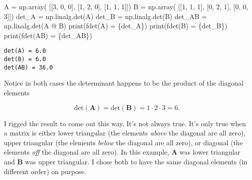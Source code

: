 \documentclass[
  letterpaper,
  DIV=11,
  numbers=noendperiod]{scrreprt}
\newenvironment{Shaded}{\begin{snugshade}}{\end{snugshade}}
\newcommand{\BuiltInTok}[1]{\textcolor[rgb]{0.00,0.23,0.31}{#1}}
\newcommand{\DecValTok}[1]{\textcolor[rgb]{0.68,0.00,0.00}{#1}}
\newcommand{\NormalTok}[1]{\textcolor[rgb]{0.00,0.23,0.31}{#1}}
\newcommand{\OperatorTok}[1]{\textcolor[rgb]{0.37,0.37,0.37}{#1}}
\newcommand{\SpecialCharTok}[1]{\textcolor[rgb]{0.37,0.37,0.37}{#1}}
\newcommand{\SpecialStringTok}[1]{\textcolor[rgb]{0.13,0.47,0.30}{#1}}
\begin{document}
\begin{Shaded}
\begin{Highlighting}[]
\NormalTok{A }\OperatorTok{=}\NormalTok{ np.array(}
\NormalTok{    [[}\DecValTok{3}\NormalTok{, }\DecValTok{0}\NormalTok{, }\DecValTok{0}\NormalTok{],}
\NormalTok{     [}\DecValTok{1}\NormalTok{, }\DecValTok{2}\NormalTok{, }\DecValTok{0}\NormalTok{],}
\NormalTok{     [}\DecValTok{1}\NormalTok{, }\DecValTok{1}\NormalTok{, }\DecValTok{1}\NormalTok{]])}
\NormalTok{B }\OperatorTok{=}\NormalTok{ np.array(}
\NormalTok{    [[}\DecValTok{1}\NormalTok{, }\DecValTok{1}\NormalTok{, }\DecValTok{1}\NormalTok{],}
\NormalTok{     [}\DecValTok{0}\NormalTok{, }\DecValTok{2}\NormalTok{, }\DecValTok{1}\NormalTok{],}
\NormalTok{     [}\DecValTok{0}\NormalTok{, }\DecValTok{0}\NormalTok{, }\DecValTok{3}\NormalTok{]])}
\NormalTok{det\_A }\OperatorTok{=}\NormalTok{ np.linalg.det(A)}
\NormalTok{det\_B }\OperatorTok{=}\NormalTok{ np.linalg.det(B)}
\NormalTok{det\_AB }\OperatorTok{=}\NormalTok{ np.linalg.det(A }\OperatorTok{@}\NormalTok{ B)}
\BuiltInTok{print}\NormalTok{(}\SpecialStringTok{f\textquotesingle{}det(A) = }\SpecialCharTok{\{}\NormalTok{det\_A}\SpecialCharTok{\}}\SpecialStringTok{\textquotesingle{}}\NormalTok{)}
\BuiltInTok{print}\NormalTok{(}\SpecialStringTok{f\textquotesingle{}det(B) = }\SpecialCharTok{\{}\NormalTok{det\_B}\SpecialCharTok{\}}\SpecialStringTok{\textquotesingle{}}\NormalTok{)}
\BuiltInTok{print}\NormalTok{(}\SpecialStringTok{f\textquotesingle{}det(AB) = }\SpecialCharTok{\{}\NormalTok{det\_AB}\SpecialCharTok{\}}\SpecialStringTok{\textquotesingle{}}\NormalTok{)}
\end{Highlighting}
\end{Shaded}

\begin{verbatim}
det(A) = 6.0
det(B) = 6.0
det(AB) = 36.0
\end{verbatim}

Notice in both cases the determinant happens to be the product of the
diagonal elements

\[\text{det}(\mathbf{A}) = \text{det}(\mathbf{B}) = 1 \cdot 2 \cdot 3 = 6.\]

I rigged the result to come out this way. It's not always true. It's
only true when a matrix is either lower triangular (the elements
\emph{above} the diagonal are all zero), upper triangular (the elements
\emph{below} the diagonal are all zero), or diagonal (the elements
\emph{off} the diagonal are all zero). In this example, \(\mathbf{A}\)
was lower triangular and \(\mathbf{B}\) was upper triangular. I chose
both to have the same diagonal elements (in different order) on purpose.
\end{document}
